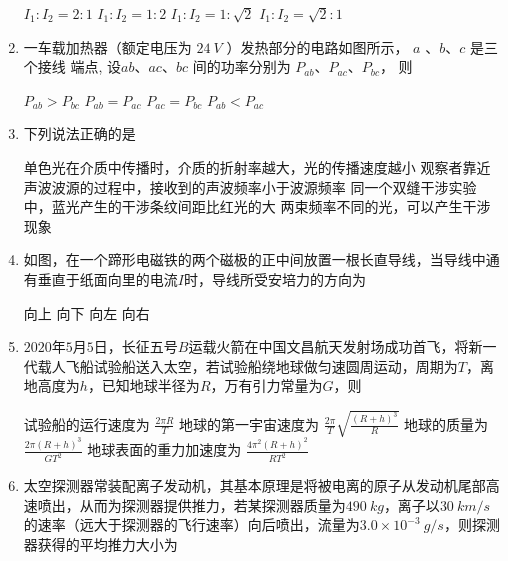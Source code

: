 \begin{enumerate}
\fourchoices
{$I_{1}: I_{2}=2: 1$}
{$I_{1}: I_{2}=1: 2$}
{$I_{1}: I_{2}=1: \sqrt{2}$}
{$I_{1}: I_{2}=\sqrt{2}: 1$}





\item
 一车载加热器（额定电压为 $24 \ V$ ）发热部分的电路如图所示， $a$ 、$ b $、$ c $ 是三个接线
端点, 设$ ab $、$ ac $、$ bc $ 间的功率分别为 $P_{ab} $、$ P_{ac} $、$ P_{bc} $， 则  
\begin{figure}[h!]
	\centering
	
\end{figure}


\fourchoices
{$P_{ab}>P_{bc}$}
{$ P_{a b}=P_{a c}$}
{$P_{ac}=P_{b c}$}
{$P_{ab}<P_{ac}$}



\item
下列说法正确的是  

\fourchoices
{单色光在介质中传播时，介质的折射率越大，光的传播速度越小}
{观察者靠近声波波源的过程中，接收到的声波频率小于波源频率}
{同一个双缝干涉实验中，蓝光产生的干涉条纹间距比红光的大}
{两束频率不同的光，可以产生干涉现象}





\item
如图，在一个蹄形电磁铁的两个磁极的正中间放置一根长直导线，当导线中通有垂直于纸面向里的电流$ I $时，导线所受安培力的方向为  
\begin{figure}[h!]
	\centering
	
\end{figure}

\fourchoices
{向上}
{向下}
{向左}
{向右}



\item
$ 2020 $年$ 5 $月$ 5 $日，长征五号$ B $运载火箭在中国文昌航天发射场成功首飞，将新一代载人飞船试验船送入太空，若试验船绕地球做匀速圆周运动，周期为$ T $，离地高度为$ h $，已知地球半径为$ R $，万有引力常量为$ G $，则  

\fourchoices
{试验船的运行速度为 $\frac{2 \pi R}{T}$}
{地球的第一宇宙速度为 $\frac{2 \pi}{T} \sqrt{\frac{(R+h)^{3}}{R}}$}
{地球的质量为 $\frac{2 \pi(R+h)^{3}}{G T^{2}}$}
{地球表面的重力加速度为 $\frac{4 \pi^{2}(R+h)^{2}}{R T^{2}}$}

\item 
太空探测器常装配离子发动机，其基本原理是将被电离的原子从发动机尾部高速喷出，从而为探测器提供推力，若某探测器质量为$ 490 \ kg $，离子以$ 30 \ km /s $的速率（远大于探测器的飞行速率）向后喷出，流量为$ 3.0 \times 10^{-3} \ g /s $，则探测器获得的平均推力大小为  


\end{enumerate}
